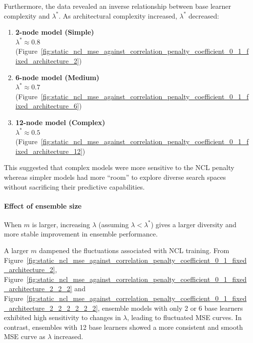 Furthermore, the data revealed an inverse relationship between base learner complexity and $\lambda^*$. As architectural complexity increased, $\lambda^*$ decreased: 
\begin{enumerate}
    \item \textbf{2-node model (Simple)} \\
    $\lambda^* \approx 0.8$ (Figure~\ref{fig:static_ncl_mse_against_correlation_penalty_coefficient_0_1_fixed_architecture_2})

    \item \textbf{6-node model (Medium)} \\
    $\lambda^* \approx 0.7$ (Figure~\ref{fig:static_ncl_mse_against_correlation_penalty_coefficient_0_1_fixed_architecture_6})

    \item \textbf{12-node model (Complex)} \\
    $\lambda^* \approx 0.5$ (Figure~\ref{fig:static_ncl_mse_against_correlation_penalty_coefficient_0_1_fixed_architecture_12})
\end{enumerate}

This suggested that complex models were more sensitive to the NCL penalty whereas simpler models had more ``room'' to explore diverse search spaces without sacrificing their predictive capabilities. 

\paragraph{Effect of ensemble size}
When $m$ is larger, increasing $\lambda$ (assuming $\lambda < \lambda^*$) gives a larger diversity and more stable improvement in ensemble performance. 

A larger $m$ dampened the fluctuations associated with NCL training. From Figure~\ref{fig:static_ncl_mse_against_correlation_penalty_coefficient_0_1_fixed_architecture_2}, Figure~\ref{fig:static_ncl_mse_against_correlation_penalty_coefficient_0_1_fixed_architecture_2_2_2} and Figure~\ref{fig:static_ncl_mse_against_correlation_penalty_coefficient_0_1_fixed_architecture_2_2_2_2_2_2}, ensemble models with only 2 or 6 base learners exhibited high sensitivity to changes in $\lambda$, leading to fluctuated MSE curves. In contrast, ensembles with 12 base learners showed a more consistent and smooth MSE curve as $\lambda$ increased. 

